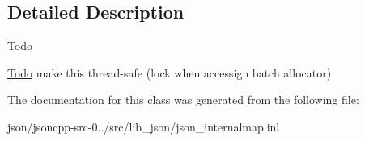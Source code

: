 \subsection{Detailed Description}
\begin{DoxyRefDesc}{Todo}
\item[\hyperlink{todo__todo000055}{Todo}]make this thread-\/safe (lock when accessign batch allocator) \end{DoxyRefDesc}


The documentation for this class was generated from the following file\+:\begin{DoxyCompactItemize}
\item 
json/jsoncpp-\/src-\/0../src/lib\+\_\+json/json\+\_\+internalmap.\+inl\end{DoxyCompactItemize}
